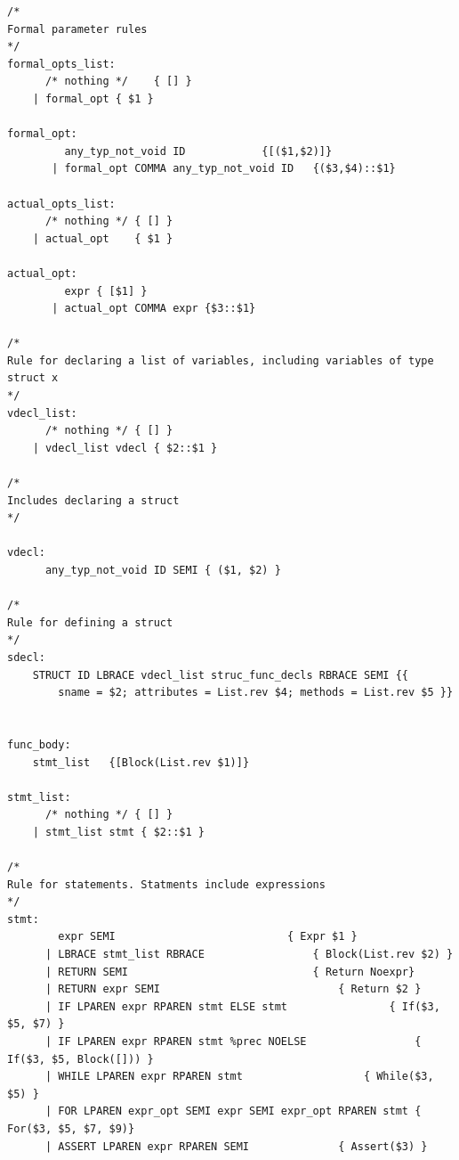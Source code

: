 \documentclass{article}
\begin{document}
\begin{lstlisting}
/*
Formal parameter rules
*/
formal_opts_list:
	  /* nothing */    { [] }
	| formal_opt { $1 }

formal_opt:
	     any_typ_not_void ID 			{[($1,$2)]}
	   | formal_opt COMMA any_typ_not_void ID 	{($3,$4)::$1}

actual_opts_list:
	  /* nothing */ { [] }
	| actual_opt 	{ $1 }

actual_opt:
	     expr { [$1] }
	   | actual_opt COMMA expr {$3::$1}

/* 
Rule for declaring a list of variables, including variables of type struct x 
*/
vdecl_list: 
	  /* nothing */ { [] }
	| vdecl_list vdecl { $2::$1 }

/*
Includes declaring a struct
*/

vdecl:
	  any_typ_not_void ID SEMI { ($1, $2) }

/* 
Rule for defining a struct 
*/
sdecl:
	STRUCT ID LBRACE vdecl_list struc_func_decls RBRACE SEMI {{
		sname = $2; attributes = List.rev $4; methods = List.rev $5 }}


func_body: 
	stmt_list 	{[Block(List.rev $1)]}

stmt_list:
	  /* nothing */ { [] }
	| stmt_list stmt { $2::$1 }

/* 
Rule for statements. Statments include expressions 
*/
stmt:
	    expr SEMI 						    { Expr $1 }
	  | LBRACE stmt_list RBRACE				    { Block(List.rev $2) }
	  | RETURN SEMI					            { Return Noexpr}
	  | RETURN expr SEMI				            { Return $2 }
	  | IF LPAREN expr RPAREN stmt ELSE stmt 	            { If($3, $5, $7) }
	  | IF LPAREN expr RPAREN stmt %prec NOELSE 	       	    { If($3, $5, Block([])) }
	  | WHILE LPAREN expr RPAREN stmt 		       	    { While($3, $5) }
  	  | FOR LPAREN expr_opt SEMI expr SEMI expr_opt RPAREN stmt { For($3, $5, $7, $9)}
	  | ASSERT LPAREN expr RPAREN SEMI 			    { Assert($3) }


\end{lstlisting}
\end{document}
